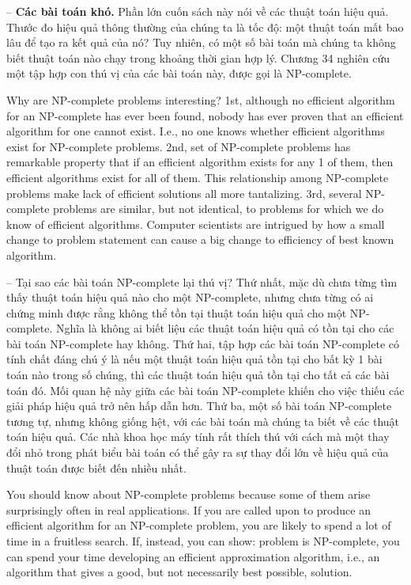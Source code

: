 \documentclass{article}
\begin{document}
\begin{itemize}
\begin{itemize}
\begin{itemize}
            -- {\bf Các bài toán khó.} Phần lớn cuốn sách này nói về các thuật toán hiệu quả. Thước đo hiệu quả thông thường của chúng ta là tốc độ: một thuật toán mất bao lâu để tạo ra kết quả của nó? Tuy nhiên, có một số bài toán mà chúng ta không biết thuật toán nào chạy trong khoảng thời gian hợp lý. Chương 34 nghiên cứu một tập hợp con thú vị của các bài toán này, được gọi là NP-complete.
            
            Why are NP-complete problems interesting? 1st, although no efficient algorithm for an NP-complete has ever been found, nobody has ever proven that an efficient algorithm for one cannot exist. I.e., no one knows whether efficient algorithms exist for NP-complete problems. 2nd, set of NP-complete problems has remarkable property that if an efficient algorithm exists for any 1 of them, then efficient algorithms exist for all of them. This relationship among NP-complete problems make lack of efficient solutions all more tantalizing. 3rd, several NP-complete problems are similar, but not identical, to problems for which we do know of efficient algorithms. Computer scientists are intrigued by how a small change to problem statement can cause a big change to efficiency of best known algorithm.
            
            -- Tại sao các bài toán NP-complete lại thú vị? Thứ nhất, mặc dù chưa từng tìm thấy thuật toán hiệu quả nào cho một NP-complete, nhưng chưa từng có ai chứng minh được rằng không thể tồn tại thuật toán hiệu quả cho một NP-complete. Nghĩa là không ai biết liệu các thuật toán hiệu quả có tồn tại cho các bài toán NP-complete hay không. Thứ hai, tập hợp các bài toán NP-complete có tính chất đáng chú ý là nếu một thuật toán hiệu quả tồn tại cho bất kỳ 1 bài toán nào trong số chúng, thì các thuật toán hiệu quả tồn tại cho tất cả các bài toán đó. Mối quan hệ này giữa các bài toán NP-complete khiến cho việc thiếu các giải pháp hiệu quả trở nên hấp dẫn hơn. Thứ ba, một số bài toán NP-complete tương tự, nhưng không giống hệt, với các bài toán mà chúng ta biết về các thuật toán hiệu quả. Các nhà khoa học máy tính rất thích thú với cách mà một thay đổi nhỏ trong phát biểu bài toán có thể gây ra sự thay đổi lớn về hiệu quả của thuật toán được biết đến nhiều nhất.
            
            You should know about NP-complete problems because some of them arise surprisingly often in real applications. If you are called upon to produce an efficient algorithm for an NP-complete problem, you are likely to spend a lot of  time in a fruitless search. If, instead, you can show: problem is NP-complete, you can spend your time developing an efficient approximation algorithm, i.e., an algorithm that gives a good, but not necessarily best possible, solution.
            

\end{itemize}
\end{itemize}
\end{itemize}
\end{document}
